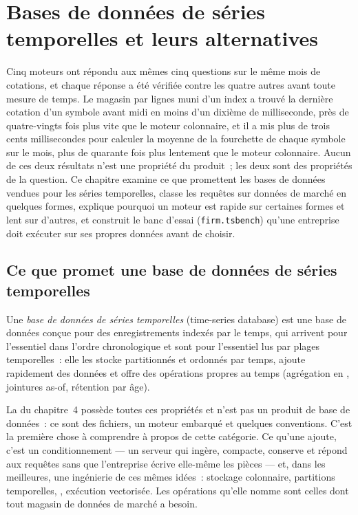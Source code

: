 \chapter{Bases de données de séries temporelles et leurs alternatives}\label{ch:pl:time-series-databases-and-the-alternatives}

Cinq moteurs ont répondu aux mêmes cinq questions sur le même mois de cotations, et chaque réponse a été vérifiée contre les quatre autres
avant toute mesure de temps. Le magasin par lignes muni d'un index a trouvé la dernière cotation d'un symbole avant midi en moins d'un dixième
de milliseconde, près de quatre-vingts fois plus vite que le moteur colonnaire, et il a mis plus de trois cents millisecondes pour calculer la
moyenne de la fourchette de chaque symbole sur le mois, plus de quarante fois plus lentement que le moteur colonnaire. Aucun de ces deux résultats n'est une propriété du produit~; les deux sont
des propriétés de la question. Ce chapitre examine ce que promettent les bases de données vendues pour les séries temporelles, classe les requêtes sur données de marché
en quelques formes, explique pourquoi un moteur est rapide sur certaines formes et lent sur d'autres, et construit le banc d'essai
(\texttt{firm.tsbench}) qu'une entreprise doit exécuter sur ses propres données avant de choisir.

\section{Ce que promet une base de données de séries temporelles}

\begin{definition}\label{def:pl:time-series-databases-and-the-alternatives:tsdb}
Une \emph{base de données de séries temporelles} (time-series database) est une base de données conçue pour des enregistrements indexés par le temps, qui arrivent pour l'essentiel
dans l'ordre chronologique et sont pour l'essentiel lus par plages temporelles~: elle les stocke partitionnés et ordonnés par temps, ajoute rapidement des données et offre des
opérations propres au temps (agrégation en , jointures as-of, rétention par âge).
\end{definition}

La  du chapitre~4 possède toutes ces propriétés et n'est pas un produit de base de données~: ce sont des fichiers, un moteur embarqué et
quelques conventions. C'est la première chose à comprendre à propos de cette catégorie. Ce qu'une  ajoute, c'est un conditionnement ---
un serveur qui ingère, compacte, conserve et répond aux requêtes sans que l'entreprise écrive elle-même les pièces --- et, dans les meilleures,
une ingénierie de ces mêmes idées~: stockage colonnaire, partitions temporelles, , exécution vectorisée. Les opérations qu'elle nomme sont
celles dont tout magasin de données de marché a besoin.

